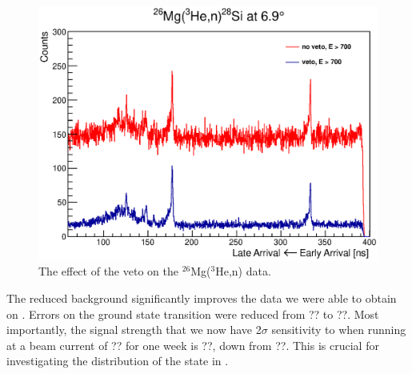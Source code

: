 \begin{figure}[htp]
\centering
\includegraphics[width=5in]{figures/veto_26Mg.eps}
\caption{\label{fig:vetoData}The effect of the veto on the $^{26}$Mg($^3$He,n) data.}
\label{fig:veto_26Mg}
\end{figure}

The reduced background significantly improves the data we were able to obtain on \MgReaction.  Errors on the ground state transition were reduced from ?? to ??.  Most importantly, the signal strength that we now have 2$\sigma$ sensitivity to when running at a beam current of ?? for one week is ??, down from ??.  This is crucial for investigating the distribution of the \zp state in \GeTargets.

